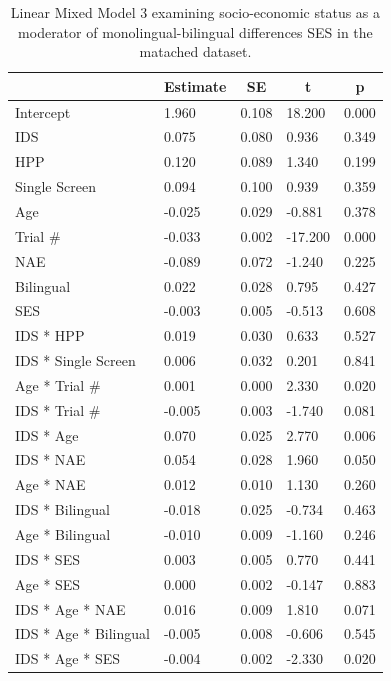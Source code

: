 \documentclass[english,,man,floatsintext]{apa6}
\begin{document}
\begin{table}[tbp]

\begin{center}
\begin{threeparttable}

\caption{\label{tab:unnamed-chunk-11}Linear Mixed Model 3 examining socio-economic status as a moderator of monolingual-bilingual differences SES in the matached dataset.}

\begin{tabular}{lllll}
\toprule
 & \multicolumn{1}{c}{Estimate} & \multicolumn{1}{c}{SE} & \multicolumn{1}{c}{t} & \multicolumn{1}{c}{p}\\
\midrule
Intercept & 1.960 & 0.108 & 18.200 & 0.000\\
IDS & 0.075 & 0.080 & 0.936 & 0.349\\
HPP & 0.120 & 0.089 & 1.340 & 0.199\\
Single Screen & 0.094 & 0.100 & 0.939 & 0.359\\
Age & -0.025 & 0.029 & -0.881 & 0.378\\
Trial \# & -0.033 & 0.002 & -17.200 & 0.000\\
NAE & -0.089 & 0.072 & -1.240 & 0.225\\
Bilingual & 0.022 & 0.028 & 0.795 & 0.427\\
SES & -0.003 & 0.005 & -0.513 & 0.608\\
IDS * HPP & 0.019 & 0.030 & 0.633 & 0.527\\
IDS * Single Screen & 0.006 & 0.032 & 0.201 & 0.841\\
Age * Trial \# & 0.001 & 0.000 & 2.330 & 0.020\\
IDS * Trial \# & -0.005 & 0.003 & -1.740 & 0.081\\
IDS * Age & 0.070 & 0.025 & 2.770 & 0.006\\
IDS * NAE & 0.054 & 0.028 & 1.960 & 0.050\\
Age * NAE & 0.012 & 0.010 & 1.130 & 0.260\\
IDS * Bilingual & -0.018 & 0.025 & -0.734 & 0.463\\
Age * Bilingual & -0.010 & 0.009 & -1.160 & 0.246\\
IDS * SES & 0.003 & 0.005 & 0.770 & 0.441\\
Age * SES & 0.000 & 0.002 & -0.147 & 0.883\\
IDS * Age * NAE & 0.016 & 0.009 & 1.810 & 0.071\\
IDS * Age * Bilingual & -0.005 & 0.008 & -0.606 & 0.545\\
IDS * Age * SES & -0.004 & 0.002 & -2.330 & 0.020\\
\bottomrule
\end{tabular}

\end{threeparttable}
\end{center}

\end{table}
\end{document}
